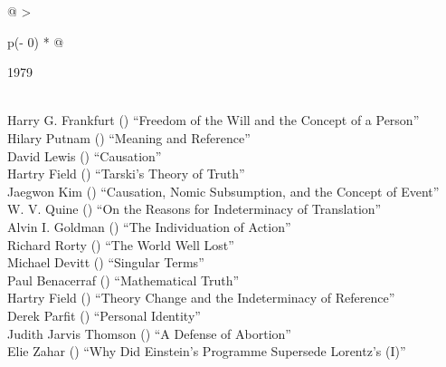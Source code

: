 \documentclass[
  10pt,
  letterpaper,
  DIV=11,
  numbers=noendperiod,
  twoside]{scrartcl}
\begin{document}
\begin{longtable}[]{@{}
  >{\raggedright\arraybackslash}p{(\columnwidth - 0\tabcolsep) * }@{}}

\caption{\label{tbl-top-ten-1970}Most cited articles published less than
ten years ago as of 1979.}

\tabularnewline

\toprule\noalign{}
\begin{minipage}[b]{\linewidth}\raggedright
1979
\end{minipage} \\
\midrule\noalign{}
\endhead
\bottomrule\noalign{}
\endlastfoot
Harry G. Frankfurt
()
``Freedom of the Will and the Concept of a Person'' \\
Hilary Putnam
()
``Meaning and Reference'' \\
David Lewis
()
``Causation'' \\
Hartry Field
()
``Tarski's Theory of Truth'' \\
Jaegwon Kim
()
``Causation, Nomic Subsumption, and the Concept of Event'' \\
W. V. Quine
()
``On the Reasons for Indeterminacy of Translation'' \\
Alvin I. Goldman
()
``The Individuation of Action'' \\
Richard Rorty
()
``The World Well Lost'' \\
Michael Devitt
()
``Singular Terms'' \\
Paul Benacerraf
()
``Mathematical Truth'' \\
Hartry Field
()
``Theory Change and the Indeterminacy of Reference'' \\
Derek Parfit
()
``Personal Identity'' \\
Judith Jarvis Thomson
()
``A Defense of Abortion'' \\
Elie Zahar
()
``Why Did Einstein's Programme Supersede Lorentz's (I)'' \\

\end{longtable}
\end{document}
